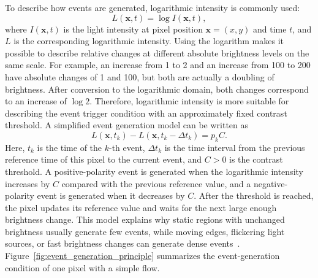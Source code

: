 To describe how events are generated, logarithmic intensity is commonly used:
\begin{equation}
L(\mathbf{x},t)=\log I(\mathbf{x},t),
\end{equation}
where $I(\mathbf{x},t)$ is the light intensity at pixel position $\mathbf{x}=(x,y)$ and time $t$, and $L$ is the corresponding logarithmic intensity. Using the logarithm makes it possible to describe relative changes at different absolute brightness levels on the same scale. For example, an increase from 1 to 2 and an increase from 100 to 200 have absolute changes of 1 and 100, but both are actually a doubling of brightness. After conversion to the logarithmic domain, both changes correspond to an increase of $\log 2$. Therefore, logarithmic intensity is more suitable for describing the event trigger condition with an approximately fixed contrast threshold. A simplified event generation model can be written as
\begin{equation}
L(\mathbf{x},t_k)-L(\mathbf{x},t_k-\Delta t_k)=p_k C.
\end{equation}
Here, $t_k$ is the time of the $k$-th event, $\Delta t_k$ is the time interval from the previous reference time of this pixel to the current event, and $C>0$ is the contrast threshold. A positive-polarity event is generated when the logarithmic intensity increases by $C$ compared with the previous reference value, and a negative-polarity event is generated when it decreases by $C$. After the threshold is reached, the pixel updates its reference value and waits for the next large enough brightness change. This model explains why static regions with unchanged brightness usually generate few events, while moving edges, flickering light sources, or fast brightness changes can generate dense events~\parencite{gallego2022}. Figure~\ref{fig:event_generation_principle} summarizes the event-generation condition of one pixel with a simple flow.

